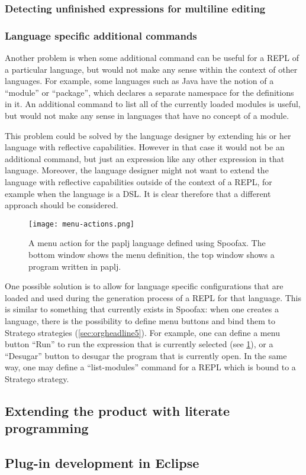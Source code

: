 \subsubsection{Detecting unfinished expressions for multiline editing}
\label{sec:detect-unfin-expr}

\subsubsection{Language specific additional commands}
\label{sec:lang-spec-addit}
Another problem is when some additional command can be useful for a
REPL of a particular language, but would not make any sense within the
context of other languages. For example, some languages such as Java
have the notion of a ``module'' or ``package'', which declares a
separate namespace for the definitions in it. An additional command to
list all of the currently loaded modules is useful, but would not make
any sense in languages that have no concept of a module.

This problem could be solved by the language designer by extending his
or her language with reflective capabilities. However in that case it
would not be an additional command, but just an expression like any
other expression in that language. Moreover, the language designer
might not want to extend the language with reflective capabilities
outside of the context of a REPL, for example when the language is a
DSL. It is clear therefore that a different approach should be
considered.

\begin{figure}[htbp]
  \centering
  \texttt{[image: menu-actions.png]}
  \caption{A menu action for the paplj language defined using
    Spoofax. The bottom window shows the menu definition, the top
    window shows a program written in paplj.}
  \label{fig:menu-actions}
\end{figure}

One possible solution is to allow for language specific configurations
that are loaded and used during the generation process of a REPL for
that language. This is similar to something that currently exists in
Spoofax: when one creates a language, there is the possibility to
define menu buttons and bind them to Stratego strategies
(\cref{sec:orgheadline5}). For example, one can define a menu button
``Run'' to run the expression that is currently selected (see
\cref{fig:menu-actions}), or a ``Desugar'' button to desugar the
program that is currently open. In the same way, one may define a
``list-modules'' command for a REPL which is bound to a Stratego
strategy.

\subsection{Extending the product with literate programming}
\label{sec:extend-prod-with}

\subsection{Plug-in development in Eclipse}
\label{ssec:eclipse-plugins}


